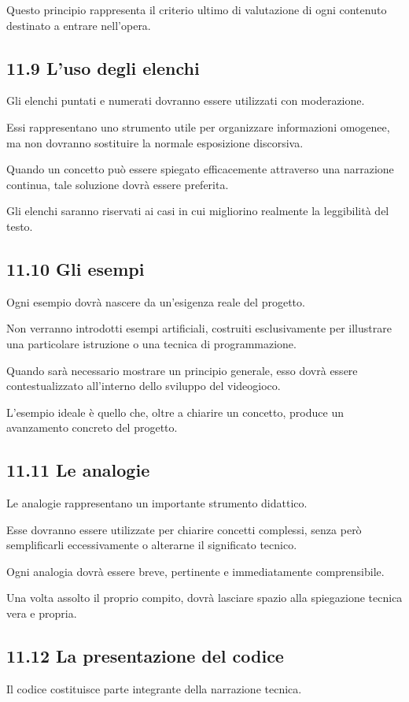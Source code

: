 \documentclass{article}
\begin{document}
Questo principio rappresenta il criterio ultimo di valutazione di ogni contenuto destinato a entrare nell'opera.

\subsection[11.9 L{}'uso degli elenchi]{11.9 L'uso degli elenchi}
Gli elenchi puntati e numerati dovranno essere utilizzati con moderazione.

Essi rappresentano uno strumento utile per organizzare informazioni omogenee, ma non dovranno sostituire la normale
esposizione discorsiva.

Quando un concetto può essere spiegato efficacemente attraverso una narrazione continua, tale soluzione dovrà essere
preferita.

Gli elenchi saranno riservati ai casi in cui migliorino realmente la leggibilità del testo.

\subsection{11.10 Gli esempi}
Ogni esempio dovrà nascere da un'esigenza reale del progetto.

Non verranno introdotti esempi artificiali, costruiti esclusivamente per illustrare una particolare istruzione o una
tecnica di programmazione.

Quando sarà necessario mostrare un principio generale, esso dovrà essere contestualizzato all'interno dello sviluppo del
videogioco.

L'esempio ideale è quello che, oltre a chiarire un concetto, produce un avanzamento concreto del progetto.

\subsection{11.11 Le analogie}
Le analogie rappresentano un importante strumento didattico.

Esse dovranno essere utilizzate per chiarire concetti complessi, senza però semplificarli eccessivamente o alterarne il
significato tecnico.

Ogni analogia dovrà essere breve, pertinente e immediatamente comprensibile.

Una volta assolto il proprio compito, dovrà lasciare spazio alla spiegazione tecnica vera e propria.

\subsection{11.12 La presentazione del codice}
Il codice costituisce parte integrante della narrazione tecnica.
\end{document}
